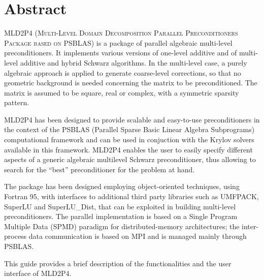 \section*{Abstract}
\textsc{MLD2P4 (Multi-Level Domain Decomposition Parallel Preconditioners Package based on
PSBLAS}) is a package of parallel algebraic multi-level preconditioners.
It implements various versions of one-level additive and of multi-level additive
and hybrid Schwarz algorithms. In the multi-level case, a purely algebraic approach
is applied to generate coarse-level corrections, so that no geometric background is needed
concerning the matrix to be preconditioned. The matrix is assumed to be square, real
or complex, with a symmetric sparsity pattern. 

MLD2P4 has been designed to provide scalable and easy-to-use preconditioners in the
context of the PSBLAS (Parallel Sparse Basic Linear Algebra Subprograms)
computational framework and can be used in conjuction with the Krylov solvers
available in this framework. MLD2P4 enables the user to easily specify different aspects
of a generic algebraic multilevel Schwarz preconditioner, thus allowing to search
for the ``best'' preconditioner for the problem at hand. 

The package has been designed  employing object-oriented techniques,
using Fortran 95, with interfaces to additional third party libraries
such as UMFPACK, SuperLU and SuperLU\_Dist, that
can be exploited in building multi-level preconditioners. The parallel
implementation is based on a Single Program Multiple Data (SPMD)
paradigm for distributed-memory architectures; the inter-process data
communication is based on MPI and is managed mainly through PSBLAS.

This guide provides a brief description of the functionalities and
the user interface of MLD2P4.
